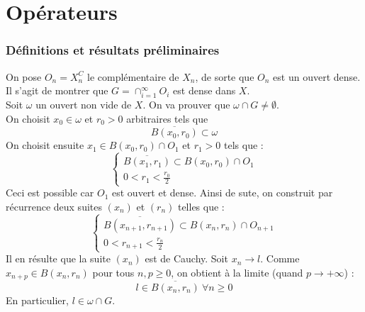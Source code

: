 \part{Opérateurs}
\section{Définitions et résultats préliminaires}

\begin{dem}
	On pose $O_n=X_n^C$ le complémentaire de $X_n$, de sorte que $O_n$ est un ouvert dense. Il s'agit de montrer que $G=\cap_{i=1}^\infty O_i$ est dense dans $X$.\\
	Soit $\omega$ un ouvert non vide de $X$. On va prouver que $\omega\cap G\neq\emptyset$. \\
	On choisit $x_0\in\omega$ et $r_0>0$ arbitraires tels que \[\overline{B(x_0,r_0)}\subset\omega\]
	On choisit ensuite $x_1\in B(x_0,r_0)\cap O_1$ et $r_1>0$ tels que : 
	\[\left\{\begin{array}{c}
		\overline{B(x_1,r_1)}\subset B(x_0,r_0)\cap O_1\\
		0<r_1<\frac{r_0}{2}
	\end{array}\right.\]
	Ceci est possible car $O_1$ est ouvert et dense. Ainsi de sute, on construit par récurrence deux suites $(x_n)$ et $(r_n)$ telles que :	
	\[\left\{\begin{array}{c}
		\overline{B(x_{n+1},r_{n+1})}\subset B(x_n,r_n)\cap O_{n+1}\\
		0<r_{n+1}<\frac{r_n}{2}
	\end{array}\right.\]
	Il en résulte que la suite $(x_n)$ est de Cauchy. Soit $x_n\to l$. Comme $x_{n+p}\in B(x_n,r_n)$ pour tous $n, p\geq 0$, on obtient à la limite (quand $p\to +\infty$) :
	\[l\in \overline{B(x_n,r_n)}\ \forall n\geq 0\]
	En particulier, $l\in \omega\cap G$.
\end{dem}


